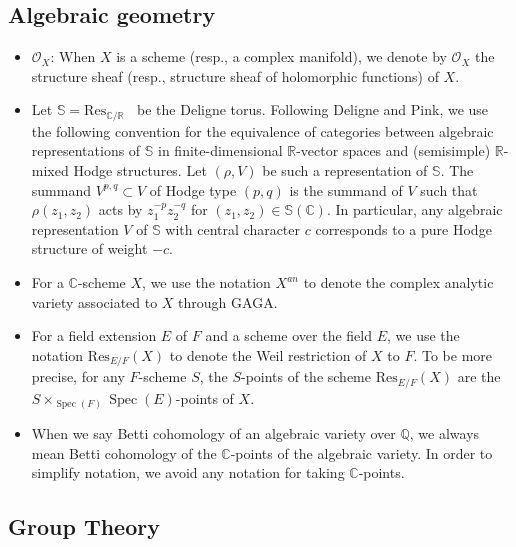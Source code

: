 \documentclass[11pt, a4paper]{amsart}
\theoremstyle{plain}
\theoremstyle{definition}
\numberwithin{equation}{section}
\def\CC{\mathbb{C}}
\def\QQ{\mathbb{Q}}
\def\RR{\mathbb{R}}
\DeclareMathOperator{\Spec}{Spec}
\DeclareMathOperator{\Gm}{\mathrm{G_{m}}}
\begin{document}
\subsection*{Algebraic geometry}

\begin{itemize}
    \item $\mathcal{O}_{X}$: When $X$ is a scheme (resp., a complex manifold), we denote by $\mathcal{O}_{X}$ the structure sheaf (resp.,  structure sheaf of holomorphic functions) of $X$. 
    \item Let $\mathbb{S} = \mathrm{Res}_{\CC/\RR} \Gm$ be the Deligne torus. Following Deligne and Pink, we use the following convention for the equivalence of categories between algebraic representations of $\mathbb{S}$ in finite-dimensional $\RR$-vector spaces and (semisimple) $\RR$-mixed Hodge structures. Let  $(\rho, V)$ be such a representation of $\mathbb{S}$. The summand $V^{p, q} \subset V$ of Hodge type $(p, q)$ is the summand of $V$ such that $\rho(z_1, z_2)$ acts by $z_1^{-p}z_2^{-q}$ for $(z_1, z_2) \in \mathbb{S}(\CC)$. In particular, any algebraic representation $V$ of $\mathbb{S}$ with central character $c$ corresponds to a pure Hodge structure of weight $-c$. 
    \item For a $\CC$-scheme $X$, we use the notation $X^{an}$ to denote the complex analytic variety associated to $X$ through GAGA. 
    \item For a field extension $E$ of $F$ and a scheme over the field $E$, we use the notation $\mathrm{Res}_{E/F}(X)$ to denote the Weil restriction of $X$ to $F$. To be more precise, for any $F$-scheme $S$, the $S$-points of the scheme $\mathrm{Res}_{E/F}(X)$ are the $S \times_{\Spec (F)} \Spec (E)$-points of $X$. 
    \item When we say Betti cohomology of an algebraic variety over $\QQ$, we always mean Betti cohomology of the $\CC$-points of the algebraic variety. In order to simplify notation, we avoid any notation for taking $\CC$-points.
\end{itemize}

\subsection*{Group Theory}
\end{document}
